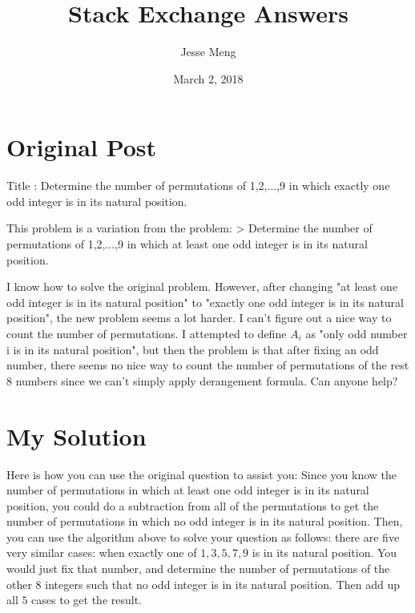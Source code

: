 \documentclass{article}
\title{Stack Exchange Answers}
\author{Jesse Meng }
\date{March 2, 2018}
\begin{document}
\maketitle

\section{Original Post}
Title : Determine the number of permutations of {1,2,...,9} in which exactly one odd integer is in its natural position.

This problem is a variation from the problem:
> Determine the number of permutations of {1,2,...,9} in which at least one odd integer is in its natural position.

I know how to solve the original problem. However, after changing "at least one odd integer is in its natural position" to "exactly one odd integer is in its natural position", the new problem seems a lot harder. I can't figure out a nice way to count the number of permutations. I attempted to define $A_i$ as "only odd number i is in its natural position", but then the problem is that after fixing an odd number, there seems no nice way to count the number of permutations of the rest 8 numbers since we can't simply apply derangement formula. Can anyone help?
\section{My Solution}
Here is how you can use the original question to assist you:
Since you know the number of permutations in which at least one odd integer is in its natural position, you could do a subtraction from all of the permutations to get the number of permutations in which no odd integer is in its natural position.
Then, you can use the algorithm above to solve your question as follows:
there are five very similar cases: when exactly one of $1,3,5,7,9$ is in its natural position. You would just fix that number, and determine the number of permutations of the other $8$ integers such that no odd integer is in its natural position. Then add up all $5$ cases to get the result.
\end{document}
